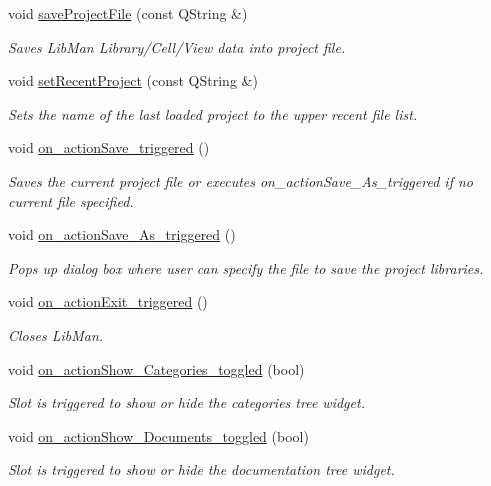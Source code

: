 \begin{DoxyCompactItemize}
void \hyperlink{classMainWindow_a8513c227af4759727cdaff0528760411}{save\-Project\-File} (const Q\-String \&)
\begin{DoxyCompactList}\small\item\em Saves Lib\-Man Library/\-Cell/\-View data into project file. \end{DoxyCompactList}\item 
void \hyperlink{classMainWindow_aafa974e05a80e493c719909da5e5b76d}{set\-Recent\-Project} (const Q\-String \&)
\begin{DoxyCompactList}\small\item\em Sets the name of the last loaded project to the upper recent file list. \end{DoxyCompactList}\item 
void \hyperlink{classMainWindow_ad550c61cfa05c7e528dedc6cf636ed10}{on\-\_\-action\-Save\-\_\-triggered} ()
\begin{DoxyCompactList}\small\item\em Saves the current project file or executes on\-\_\-action\-Save\-\_\-\-As\-\_\-triggered if no current file specified. \end{DoxyCompactList}\item 
void \hyperlink{classMainWindow_a98e86ef6104b6e2910328af2f878438d}{on\-\_\-action\-Save\-\_\-\-As\-\_\-triggered} ()
\begin{DoxyCompactList}\small\item\em Pops up dialog box where user can specify the file to save the project libraries. \end{DoxyCompactList}\item 
void \hyperlink{classMainWindow_ab4487c4b02224acd4a0193d38b704ddb}{on\-\_\-action\-Exit\-\_\-triggered} ()
\begin{DoxyCompactList}\small\item\em Closes Lib\-Man. \end{DoxyCompactList}\item 
void \hyperlink{classMainWindow_ad1c8aa9c6519123e3f314c84d46a8317}{on\-\_\-action\-Show\-\_\-\-Categories\-\_\-toggled} (bool)
\begin{DoxyCompactList}\small\item\em Slot is triggered to show or hide the categories tree widget. \end{DoxyCompactList}\item 
void \hyperlink{classMainWindow_adc9158772dde195daaa1d04276d6889a}{on\-\_\-action\-Show\-\_\-\-Documents\-\_\-toggled} (bool)
\begin{DoxyCompactList}\small\item\em Slot is triggered to show or hide the documentation tree widget. \end{DoxyCompactList}\item 

\end{DoxyCompactItemize}
